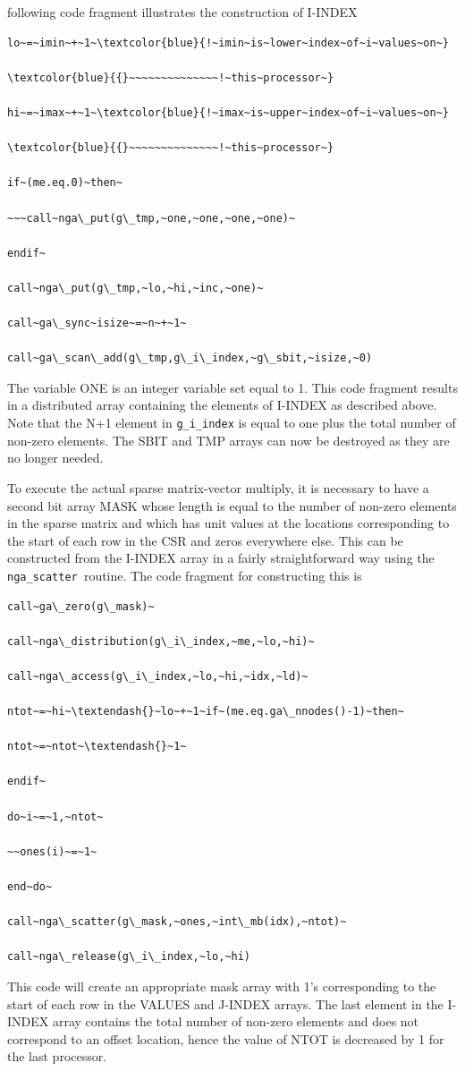 following code fragment illustrates the construction of I-INDEX
\begin{verbatim}
lo~=~imin~+~1~\textcolor{blue}{!~imin~is~lower~index~of~i~values~on~}

\textcolor{blue}{{}~~~~~~~~~~~~~~!~this~processor~}

hi~=~imax~+~1~\textcolor{blue}{!~imax~is~upper~index~of~i~values~on~}

\textcolor{blue}{{}~~~~~~~~~~~~~~!~this~processor~}

if~(me.eq.0)~then~

~~~call~nga\_put(g\_tmp,~one,~one,~one,~one)~

endif~

call~nga\_put(g\_tmp,~lo,~hi,~inc,~one)~

call~ga\_sync~isize~=~n~+~1~

call~ga\_scan\_add(g\_tmp,g\_i\_index,~g\_sbit,~isize,~0)
\end{verbatim}
The variable ONE is an integer variable set equal to 1. This code
fragment results in a distributed array containing the elements of
I-INDEX as described above. Note that the N+1 element in \texttt{g\_i\_index}
is equal to one plus the total number of non-zero elements. The SBIT
and TMP arrays can now be destroyed as they are no longer needed.

To execute the actual sparse matrix-vector multiply, it is necessary
to have a second bit array MASK whose length is equal to the number
of non-zero elements in the sparse matrix and which has unit values
at the locations corresponding to the start of each row in the CSR
and zeros everywhere else. This can be constructed from the I-INDEX
array in a fairly straightforward way using the \texttt{nga\_scatter
}routine. The code fragment for constructing this is
\begin{verbatim}
call~ga\_zero(g\_mask)~

call~nga\_distribution(g\_i\_index,~me,~lo,~hi)~

call~nga\_access(g\_i\_index,~lo,~hi,~idx,~ld)~

ntot~=~hi~\textendash{}~lo~+~1~if~(me.eq.ga\_nnodes()-1)~then~

ntot~=~ntot~\textendash{}~1~

endif~

do~i~=~1,~ntot~

~~ones(i)~=~1~

end~do~

call~nga\_scatter(g\_mask,~ones,~int\_mb(idx),~ntot)~

call~nga\_release(g\_i\_index,~lo,~hi)
\end{verbatim}
This code will create an appropriate mask array with 1\textquoteright{}s
corresponding to the start of each row in the VALUES and J-INDEX arrays.
The last element in the I-INDEX array contains the total number of
non-zero elements and does not correspond to an offset location, hence
the value of NTOT is decreased by 1 for the last processor.

